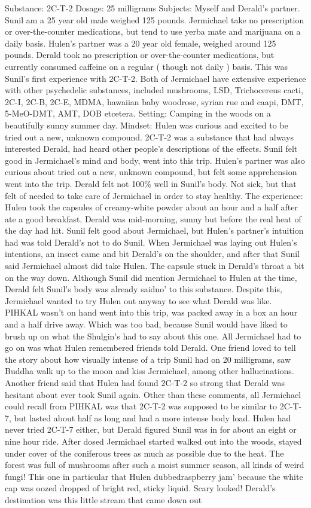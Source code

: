 \documentclass[12pt]{book}
\begin{document}
Substance: 2C-T-2 Dosage: 25 milligrams Subjects: Myself and Derald's partner. Sunil am a 25 year old male weighed 125 pounds. Jermichael take no prescription or over-the-counter medications, but tend to use yerba mate and marijuana on a daily basis. Hulen's partner was a 20 year old female, weighed around 125 pounds. Derald took no prescription or over-the-counter medications, but currently consumed caffeine on a regular ( though not daily ) basis. This was Sunil's first experience with 2C-T-2. Both of Jermichael have extensive experience with other psychedelic substances, included mushrooms, LSD, Trichocereus cacti, 2C-I, 2C-B, 2C-E, MDMA, hawaiian baby woodrose, syrian rue and caapi, DMT, 5-MeO-DMT, AMT, DOB etcetera. Setting: Camping in the woods on a beautifully sunny summer day. Mindset: Hulen was curious and excited to be tried out a new, unknown compound. 2C-T-2 was a substance that had always interested Derald, had heard other people's descriptions of the effects. Sunil felt good in Jermichael's mind and body, went into this trip. Hulen's partner was also curious about tried out a new, unknown compound, but felt some apprehension went into the trip. Derald felt not 100\% well in Sunil's body. Not sick, but that felt of needed to take care of Jermichael in order to stay healthy. The experience: Hulen took the capsules of creamy-white powder about an hour and a half after ate a good breakfast. Derald was mid-morning, sunny but before the real heat of the day had hit. Sunil felt good about Jermichael, but Hulen's partner's intuition had was told Derald's not to do Sunil. When Jermichael was laying out Hulen's intentions, an insect came and bit Derald's on the shoulder, and after that Sunil said Jermichael almost did take Hulen. The capsule stuck in Derald's throat a bit on the way down. Although Sunil did mention Jermichael to Hulen at the time, Derald felt Sunil's body was already saidno' to this substance. Despite this, Jermichael wanted to try Hulen out anyway to see what Derald was like. PIHKAL wasn't on hand went into this trip, was packed away in a box an hour and a half drive away. Which was too bad, because Sunil would have liked to brush up on what the Shulgin's had to say about this one. All Jermichael had to go on was what Hulen remembered friends told Derald. One friend loved to tell the story about how visually intense of a trip Sunil had on 20 milligrams, saw Buddha walk up to the moon and kiss Jermichael, among other hallucinations. Another friend said that Hulen had found 2C-T-2 so strong that Derald was hesitant about ever took Sunil again. Other than these comments, all Jermichael could recall from PIHKAL was that 2C-T-2 was supposed to be similar to 2C-T-7, but lasted about half as long and had a more intense body load. Hulen had never tried 2C-T-7 either, but Derald figured Sunil was in for about an eight or nine hour ride. After dosed Jermichael started walked out into the woods, stayed under cover of the coniferous trees as much as possible due to the heat. The forest was full of mushrooms after such a moist summer season, all kinds of weird fungi! This one in particular that Hulen dubbedraspberry jam' because the white cap was oozed dropped of bright red, sticky liquid. Scary looked! Derald's destination was this little stream that came down out 
\end{document}
